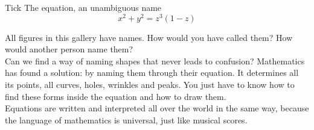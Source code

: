 \begin{surferPage}{Tick}
The equation, an unambiguous name \\
\smallskip
\[x^2 + y^2	= z^3	(1 - z) \]


\singlespacing
All figures in this gallery have names. How would you have called them? How would another person name them?\\
\vspace{0.3cm}
Can we find a way of naming shapes that never leads to confusion? Mathematics has found a solution: by naming them through their equation. It determines all its points, all curves, holes, wrinkles and peaks. You just have to know how to find these forms inside the equation and how to draw them.\\
\vspace{0.3cm}
Equations are written and interpreted all over the world in the same way, because the language of mathematics is universal, just like musical scores.
\end{surferPage}

